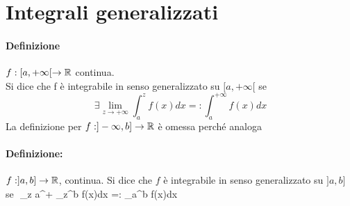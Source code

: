 \documentclass{article}
\begin{document}
\section{Integrali generalizzati}
\paragraph{Definizione} $f:[a,+ \infty[ \to \mathbb{R}$ continua. \\ Si dice che f è integrabile in senso generalizzato su $[a,+\infty[$ se
$$
\exists \lim_{z \to + \infty} \int_a^z f(x)dx =: \int_a^{+ \infty} f(x)dx
$$
La definizione per $f : ]-\infty,b] \to \mathbb{R}$ è omessa perché analoga

\paragraph{Definizione:} $f:]a,b] \to \R$, continua. Si dice che $f$ è integrabile in senso generalizzato su $]a,b]$ se 
$$
\exists \lim_{z \to a^+} \int_z^b f(x)dx =: \int_a^b f(x)dx
\end{document}
